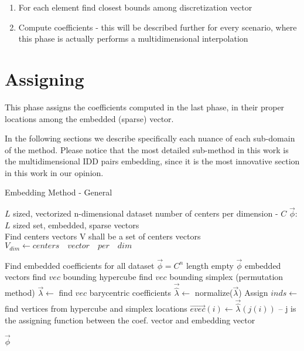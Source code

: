\begin{enumerate}
	\item For each element find closest bounds among discretization vector
	\item Compute coefficients - this will be described further for every scenario, where this phase is actually performs a multidimensional interpolation
	
\end{enumerate}
\section{Assigning}

This phase assigns the coefficients computed in the last phase, in their proper locations among the embedded (sparse) vector.

In the following sections we describe specifically each nuance of each sub-domain of the method. Please notice that the most detailed sub-method in this work is the multidimensional IDD pairs embedding, since it is the most innovative section in this work in our opinion.

\begin{algorithm}
	\caption{Embedding Method - General}
	\begin{algorithmic}
	
		\REQUIRE $L$ sized, vectorized n-dimensional dataset
		\REQUIRE number of centers per dimension - $C$
		\ENSURE $\overrightarrow{\phi}$: $L$ sized set, embedded, sparse vectors\\
		
		\STATE Find centers vectors
		\STATE V shall be a set of centers vectors
		\STATE $V_{dim} \leftarrow centers \quad vector \quad per \quad dim$
		\ENDFOR
		
		\STATE Find embedded coefficients for all dataset
		\STATE $\overrightarrow{\phi} = C^n$ length empty $\overrightarrow{\phi}$ embedded vectors
		\STATE find $vec$ bounding hypercube 
		\STATE find $vec$ bounding simplex (permutation method)
		\STATE $\overrightarrow{\lambda} \leftarrow$ find $vec$ barycentric coefficients 
		\STATE $\overrightarrow{\hat{\lambda}} \leftarrow$ normalize($\overrightarrow{\lambda}$)
		\ENDFOR
		\STATE Assign
		\STATE $inds \leftarrow$ find vertices from hypercube and simplex locations
		\STATE $\overrightarrow{evec}(i) \leftarrow \overrightarrow{\hat{\lambda}}(j(i))$ -- j is the assigning function between the coef. vector and embedding vector
		\ENDFOR
		\ENDFOR
		
		\RETURN $\overrightarrow{\phi}$
	
	\end{algorithmic}
\end{algorithm}
